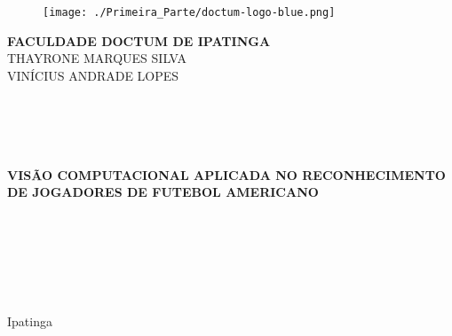 \newcommand*{\themonth}{\ifthenelse{\the\month < 2}{Janeiro }
                  {\ifthenelse{\the\month < 3}{Fevereiro }
                  {\ifthenelse{\the\month < 4}{Março }
                  {\ifthenelse{\the\month < 5}{Abril }
                  {\ifthenelse{\the\month < 6}{Maio }
                  {\ifthenelse{\the\month < 7}{Junho }
                  {\ifthenelse{\the\month < 8}{Julho }
                  {\ifthenelse{\the\month < 9}{Agosto }
                  {\ifthenelse{\the\month < 10}{Setembro }
                  {\ifthenelse{\the\month < 11}{Outubro }
                  {\ifthenelse{\the\month < 12}{Novembro }{Dezembro }}}}}}}}}}}}
                  

\begin{titlepage}
\begin{center}

	\vspace{-0.5cm}

  \begin{figure}[hbt!]
		\begin{center}
		   \texttt{[image: ./Primeira\_Parte/doctum-logo-blue.png]}
		\end{center}
	\end{figure}

  \Large{\textbf{FACULDADE DOCTUM DE IPATINGA}}\\
   \large{THAYRONE MARQUES SILVA}\\
    \large{VINÍCIUS ANDRADE LOPES}\\


  \hspace{2cm}\large{}\\
  \hspace{2cm}\large{}\\
  \hspace{2cm}\large{}\\
  \hspace{2cm}\large{}\\

  \par
  \large\textbf{VISÃO COMPUTACIONAL APLICADA NO RECONHECIMENTO DE JOGADORES DE FUTEBOL AMERICANO}

  \hspace{2cm}\large{}\\
  \hspace{2cm}\large{}\\
  \hspace{2cm}\large{}\\
  \hspace{2cm}\large{}\\

  \hspace{2cm}\large{}\\
 



\par\vfill
Ipatinga \\
\the\year

\end{center}
\end{titlepage}